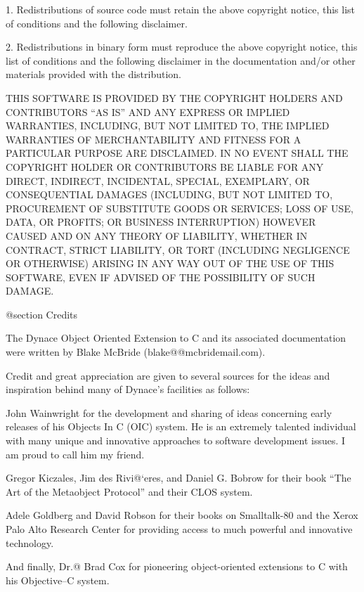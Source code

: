 1. Redistributions of source code must retain the above copyright
notice, this list of conditions and the following disclaimer.

2. Redistributions in binary form must reproduce the above copyright
notice, this list of conditions and the following disclaimer in the
documentation and/or other materials provided with the distribution.

THIS SOFTWARE IS PROVIDED BY THE COPYRIGHT HOLDERS AND CONTRIBUTORS
``AS IS'' AND ANY EXPRESS OR IMPLIED WARRANTIES, INCLUDING, BUT NOT
LIMITED TO, THE IMPLIED WARRANTIES OF MERCHANTABILITY AND FITNESS FOR
A PARTICULAR PURPOSE ARE DISCLAIMED. IN NO EVENT SHALL THE COPYRIGHT
HOLDER OR CONTRIBUTORS BE LIABLE FOR ANY DIRECT, INDIRECT, INCIDENTAL,
SPECIAL, EXEMPLARY, OR CONSEQUENTIAL DAMAGES (INCLUDING, BUT NOT
LIMITED TO, PROCUREMENT OF SUBSTITUTE GOODS OR SERVICES; LOSS OF USE,
DATA, OR PROFITS; OR BUSINESS INTERRUPTION) HOWEVER CAUSED AND ON ANY
THEORY OF LIABILITY, WHETHER IN CONTRACT, STRICT LIABILITY, OR TORT
(INCLUDING NEGLIGENCE OR OTHERWISE) ARISING IN ANY WAY OUT OF THE USE
OF THIS SOFTWARE, EVEN IF ADVISED OF THE POSSIBILITY OF SUCH DAMAGE.

@section Credits


The Dynace Object Oriented Extension to C
and its associated documentation were written by Blake McBride
(blake@@mcbridemail.com).

Credit and great appreciation are given to several sources for the
ideas and inspiration behind many of Dynace's facilities as follows:

John Wainwright for the development and sharing of ideas concerning
early releases of his Objects In C (OIC) system.  He is an extremely
talented individual with many unique and innovative approaches to
software development issues.  I am proud to call him my friend.

Gregor Kiczales, Jim des Rivi@`eres, and Daniel G. Bobrow for their
book ``The Art of the Metaobject Protocol'' and their CLOS
system.

Adele Goldberg and David Robson for their books on Smalltalk-80 and
the Xerox Palo Alto Research Center for providing access to much
powerful and innovative technology.

And finally, Dr.@ Brad Cox for pioneering object-oriented extensions
to C with his Objective--C system.


